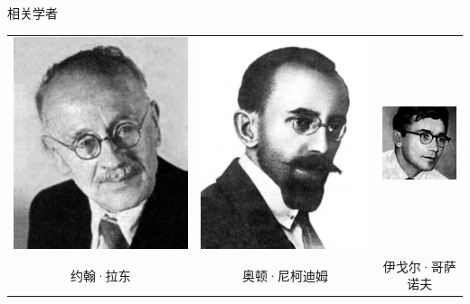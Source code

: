 \documentclass[t]{beamer}
\begin{document}
\begin{frame}{相关学者}
\begin{center}
\begin{tabular}{ccc}
	\includegraphics[height=.45\textheight]{fig/radon.jpeg}&\includegraphics[height=.45\textheight]{fig/nikodym.jpeg} &\includegraphics[height=.45\textheight]{fig/girsanov.jpg}
	\\
   约翰·拉东 & 奥顿·尼柯迪姆 & 伊戈尔·哥萨诺夫\\
\end{tabular}
\end{center}
\end{frame}
\end{document}
